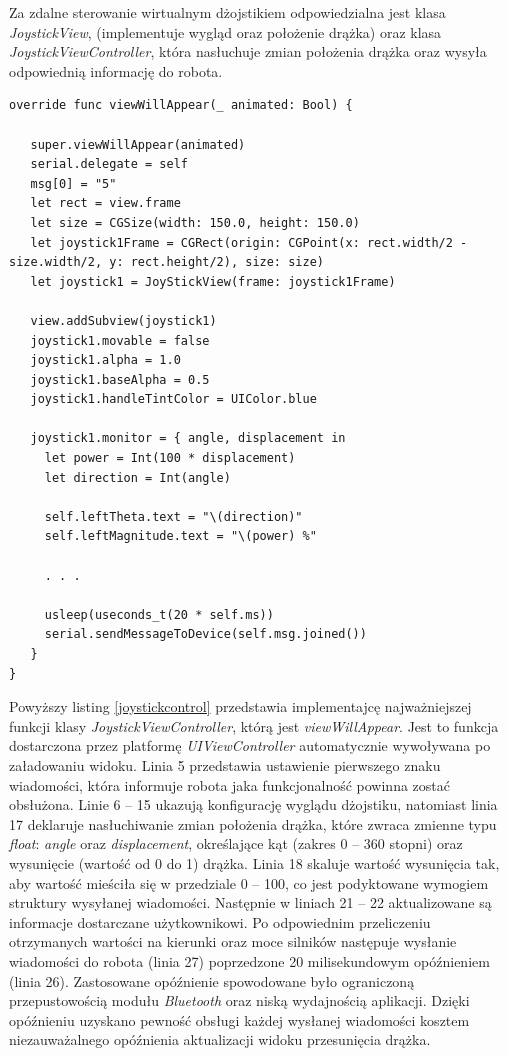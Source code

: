 Za zdalne sterowanie wirtualnym dżojstikiem odpowiedzialna jest klasa \textit{JoystickView}, (implementuje wygląd oraz położenie drążka) oraz klasa  \textit{JoystickViewController}, która nasłuchuje zmian położenia drążka oraz wysyła odpowiednią informację do robota. 

\begin{minipage}{\textwidth}
	\begin{lstlisting}[label=joystickcontrol,caption=Metoda klasy JoystickViewController.]
override func viewWillAppear(_ animated: Bool) {
    
   super.viewWillAppear(animated)
   serial.delegate = self
   msg[0] = "5"
   let rect = view.frame
   let size = CGSize(width: 150.0, height: 150.0)
   let joystick1Frame = CGRect(origin: CGPoint(x: rect.width/2 - size.width/2, y: rect.height/2), size: size)
   let joystick1 = JoyStickView(frame: joystick1Frame)
    
   view.addSubview(joystick1)
   joystick1.movable = false
   joystick1.alpha = 1.0
   joystick1.baseAlpha = 0.5 
   joystick1.handleTintColor = UIColor.blue
    
   joystick1.monitor = { angle, displacement in
     let power = Int(100 * displacement)
     let direction = Int(angle)

     self.leftTheta.text = "\(direction)"
     self.leftMagnitude.text = "\(power) %"
	
	 . . .
	
     usleep(useconds_t(20 * self.ms))
     serial.sendMessageToDevice(self.msg.joined())
   }
}  
	\end{lstlisting}
\end{minipage}

Powyższy listing \ref{joystickcontrol} przedstawia implementajcę najważniejszej funkcji klasy \textit{JoystickViewController}, którą jest \textit{viewWillAppear}. Jest to funkcja dostarczona przez platformę \textit{UIViewController} automatycznie wywoływana po załadowaniu widoku. Linia 5 przedstawia ustawienie pierwszego znaku wiadomości, która informuje robota jaka funkcjonalność powinna zostać obsłużona. Linie 6 – 15 ukazują konfigurację wyglądu dżojstiku, natomiast linia 17 deklaruje nasłuchiwanie zmian położenia drążka, które zwraca zmienne typu \textit{float}: \textit{angle} oraz \textit{displacement}, określające kąt (zakres 0 – 360 stopni) oraz wysunięcie (wartość od 0 do 1) drążka. Linia 18 skaluje wartość wysunięcia tak, aby wartość mieściła się w przedziale 0 – 100, co jest podyktowane wymogiem struktury wysyłanej wiadomości. Następnie w liniach 21 – 22 aktualizowane są informacje dostarczane użytkownikowi. Po odpowiednim przeliczeniu otrzymanych wartości na kierunki oraz moce silników następuje wysłanie wiadomości do robota (linia 27) poprzedzone 20 milisekundowym opóźnieniem (linia 26). Zastosowane opóźnienie spowodowane było ograniczoną przepustowością modułu \textit{Bluetooth} oraz niską wydajnością aplikacji. Dzięki opóźnieniu uzyskano pewność obsługi każdej wysłanej wiadomości kosztem niezauważalnego opóźnienia aktualizacji widoku przesunięcia drążka.

